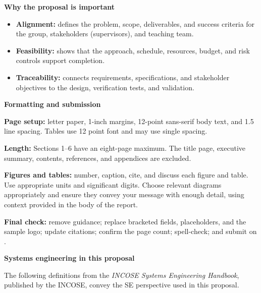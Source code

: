 \begin{singlespace}
\noindent\begin{minipage}[t]{0.485\linewidth}
{\normalsize\bfseries\color{QueensBurgundy} Why the proposal is important}\par
\begin{itemize}
  \item \textbf{Alignment:} defines the problem, scope, deliverables, and success criteria for the group, stakeholders (supervisors), and teaching team.
  \item \textbf{Feasibility:} shows that the approach, schedule, resources, budget, and risk controls support completion.
  \item \textbf{Traceability:} connects requirements, specifications, and stakeholder objectives to the design, verification tests, and validation.
\end{itemize}
\end{minipage}\hfill
\begin{minipage}[t]{0.485\linewidth}
{\normalsize\bfseries\color{QueensBurgundy} Formatting and submission}\par
\textbf{Page setup:} letter paper, 1-inch margins, 12-point sans-serif body text, and 1.5 line spacing. Tables use 12 point font and may use single spacing.\par
\textbf{Length:} Sections 1--6 have an eight-page maximum. The title page, executive summary, contents, references, and appendices are excluded. \par
\textbf{Figures and tables:} number, caption, cite, and discuss each figure and table. Use appropriate units and significant digits. Choose relevant diagrams appropriately and ensure they convey your message with enough detail, using context provided in the body of the report. \par
\textbf{Final check:} remove guidance; replace bracketed fields, placeholders, and the sample logo; update citations; confirm the page count; spell-check; and submit on \LearningPlatform.
\end{minipage}

\vspace{20pt}

{\normalsize\bfseries\color{QueensBurgundy}
Systems engineering in this proposal}\par

The following definitions from the \emph{\ac{INCOSE} Systems Engineering Handbook},
published by the \ac{INCOSE}, convey
the \ac{SE} perspective used in this proposal.

\begin{quote}
\small


\end{quote}
\end{singlespace}
